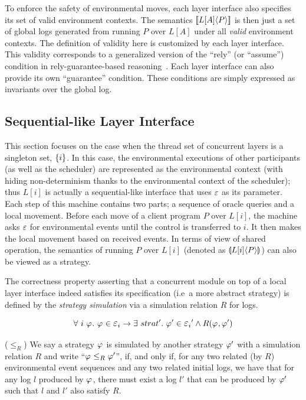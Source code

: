 To enforce the safety of environmental moves,
each layer interface also specifies its set of valid environment contexts.
The semantics $\sem{L[A]}{P}$ is then just a set of global logs
generated from running $P$ over $L[A]$ under all {\em valid}
environment contexts. 
The definition of validity here is customized
by each layer interface.
This validity  corresponds to a generalized version of
the ``rely'' (or ``assume'') condition in rely-guarantee-based
reasoning~\cite{feng07:sagl,vafeiadis:marriage,LRG,fu10:roch,sergey15}. Each layer interface can also
provide its own ``guarantee'' condition. These conditions  are simply expressed as
invariants over the global log. 


\subsection{Sequential-like Layer Interface} 

This section focuses on the case when the thread set of concurrent layers is a singleton set, $\set{i}$.
In this case, 
the environmental executions of other participants (as well as the scheduler) are
represented as  the environmental context (with hiding non-determinism thanks to the environmental context of the scheduler);
thus $L[i]$ is actually a sequential-like interface that uses $\oracle$ as its parameter. 
Each step of  this machine contains two parts; a sequence of oracle queries and a local movement.
Before each move of a client program $P$ over $L[i]$,
the  machine  asks $\oracle$ for environmental events until the control is transferred to $i$. 
It then makes the local movement based on
received events.
In terms of view of shared operation, the semantics of running $P$ over $L[i]$ (denoted as $\ssem{P}{L[i]}$) can also be viewed
as a strategy.


The correctness property asserting that a concurrent module on top of a local layer interface indeed
satisfies its specification (i.e\, a more abstract strategy) is defined
by the \emph{strategy simulation} via a simulation relation $R$ for logs.



$$\forall \ i \ \strat{} .\ \strat{} \in \oracle_{i} \rightarrow \exists \ strat{}' . \ \strat{}' \in \oracle_{i}' \wedge R(\strat{}, \strat{}')$$

\begin{definition}($\le_R$) We say a strategy $\strat{}$ is simulated by
another strategy $\strat{}'$ with a simulation relation $R$ and write ``$\strat{} \le_R \strat{}'$'', if, and only if, for any two related (by $R$) environmental event sequences and any two related initial logs, we have that
for any log $l$ produced by $\strat{}$, there must exist a log $l'$ that can be produced by $\strat{}'$ such that $l$ and $l'$ also satisfy $R$.
\end{definition}

